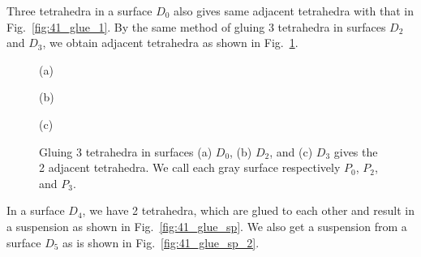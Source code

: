 \documentclass[12pt]{article}
\numberwithin{equation}{section}
\begin{document}
Three  tetrahedra in a  surface $D_0$ also gives same adjacent  tetrahedra
with that in
Fig.~\ref{fig:41_glue_1}.
By the same method of gluing 3 tetrahedra in surfaces $D_2$ and $D_3$,
we obtain adjacent  tetrahedra as shown in Fig.~\ref{fig:41_glue_2}.
\begin{figure}[htbp]
  \begin{center}
    (a)
    \parbox{4.5cm}{
      \begin{psfrags}
      \end{psfrags}
      }
%
    (b)~\parbox{4.5cm}{
      \begin{psfrags}
      \end{psfrags}
      }
%
    (c)~\parbox{4.5cm}{
      \begin{psfrags}
      \end{psfrags}
      }
    \caption{
      Gluing 3 tetrahedra in surfaces (a) $D_0$, (b) $D_2$,  and (c)
      $D_3$ gives the 2 adjacent tetrahedra.
      We call each gray
      surface  respectively $P_0$, $P_2$, and
      $P_3$.
      }
    \label{fig:41_glue_2}
  \end{center}
\end{figure}

In a surface $D_4$, we have 2 tetrahedra, which are glued to
each other
and result  in a suspension
as
shown in Fig.~\ref{fig:41_glue_sp}.
We also get a suspension from a surface $D_5$ as is shown in
Fig.~\ref{fig:41_glue_sp_2}.
\end{document}
